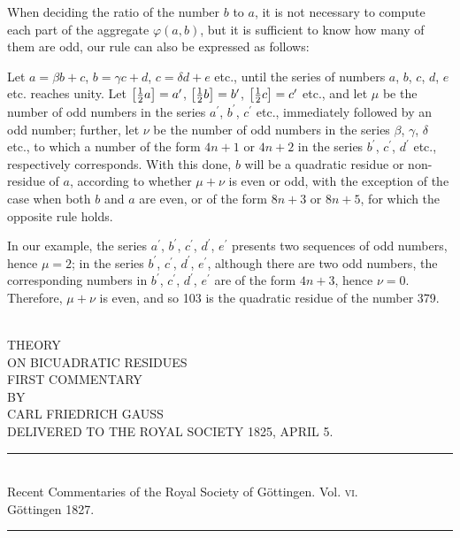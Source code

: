 \documentclass[twoside,12pt, showframe]{memoir}
\let\oldfrac\frac
\def\frac#1#2{\mathchoice{\tfrac{#1}{#2}}{\oldfrac{#1}{#2}}{\genfrac{}{}{}{2}{#1}{#2\mathstrut}}{\genfrac{}{}{}{3}{#1}{#2\mathstrut}}}
\begin{document}
When deciding the ratio of the number \(b\) to \(a\), it is not necessary to compute each part of the aggregate \(\varphi(a, b)\), but it is sufficient to know how many of them are odd, our rule can also be expressed as follows:

Let \(a = \beta b+c\), \(b = \gamma c+d\), \(c = \delta d+e\) etc., until the series of numbers \(a\), \(b\), \(c\), \(d\), \(e\) etc. reaches unity. Let \(\left[\frac{1}{2} a\right]=a^{\prime}\), \(\left[\frac{1}{2} b\right]=b^{\prime}\), \(\left[\frac{1}{2} c\right]=c^{\prime}\) etc., and let \(\mu\) be the number of odd numbers in the series \(a^{\prime}\), \(b^{\prime}\), \(c^{\prime}\) etc., immediately followed by an odd number; further, let \(\nu\) be the number of odd numbers in the series \(\beta\), \(\gamma\), \(\delta\) etc., to which a number of the form \(4n+1\) or \(4n+2\) in the series \(b^{\prime}\), \(c^{\prime}\), \(d^{\prime}\) etc., respectively corresponds. With this done, \(b\) will be a quadratic residue or non-residue of \(a\), according to whether \(\mu + \nu\) is even or odd, with the exception of the case when both \(b\) and \(a\) are even, or of the form \(8n+3\) or \(8n+5\), for which the opposite rule holds.

In our example, the series \(a^{\prime}\), \(b^{\prime}\), \(c^{\prime}\), \(d^{\prime}\), \(e^{\prime}\) presents two sequences of odd numbers, hence \(\mu =2\); in the series \(b^{\prime}\), \(c^{\prime}\), \(d^{\prime}\), \(e^{\prime}\), although there are two odd numbers, the corresponding numbers in \(b^{\prime}\), \(c^{\prime}\), \(d^{\prime}\), \(e^{\prime}\) are of the form \(4n+3\), hence \(\nu = 0\). Therefore, \(\mu + \nu\) is even, and so 103 is the quadratic residue of the number 379.
%

\begin{center}
\;\\[4\baselineskip]
{\large THEORY }\\[\baselineskip]
{\LARGE ON BICUADRATIC RESIDUES }\\[3\baselineskip]
{\large FIRST COMMENTARY}\\[2.5\baselineskip]
{\tiny BY}\\[1.5\baselineskip]
CARL FRIEDRICH GAUSS\\[1.5\baselineskip]
{\scriptsize DELIVERED TO THE ROYAL SOCIETY {\tiny \textsc{1825},} APRIL {\tiny \textsc{5}.}}\\[4\baselineskip]
\rule{4in}{0.5pt}\\[0.5\baselineskip]
{\small Recent Commentaries of the Royal Society of Göttingen. Vol. \textsc{vi}.\\
Göttingen \textsc{1827}.}\\
\rule{4in}{0.5pt}
\end{center}
\clearpage\noindent%
\;
\clearpage\noindent%
\end{document}

